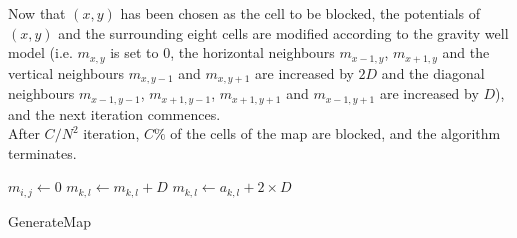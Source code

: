 \documentclass[12pt,notitlepage]{report}
\begin{document}
\noindent
Now that $(x,y)$ has been chosen as the cell to be blocked, the potentials of $(x,y)$ and the surrounding eight cells are modified according to the gravity well model (i.e. $m_{x,y}$ is set to $0$, the horizontal neighbours $m_{x-1,y}$, $m_{x+1,y}$ and the vertical neighbours $m_{x,y-1}$ and $m_{x,y+1}$ are increased by $2D$ and the diagonal neighbours $m_{x-1,y-1}$, $m_{x+1,y-1}$, $m_{x+1,y+1}$ and $m_{x-1,y+1}$ are increased by $D$), and the next iteration commences.\\

\noindent
After $C/N^{2}$ iteration, $C\%$ of the cells of the map are blocked, and the algorithm terminates.

\begin{algorithm}
  \SetAlgoLined\DontPrintSemicolon
   
   {
    \nl $m_{i,j} \gets 0$\;
    \nl {} {
      \nl {} {
        \nl $m_{k,l} \gets m_{k,l} + D$\;
      }
  }
  \nl {} {
      \nl {} {
        $m_{k,l} \gets a_{k,l} + 2\times D$\;
      }
  }
}
\caption{{\sc GenerateMap}}
 \end{algorithm} 
 
\end{document}
